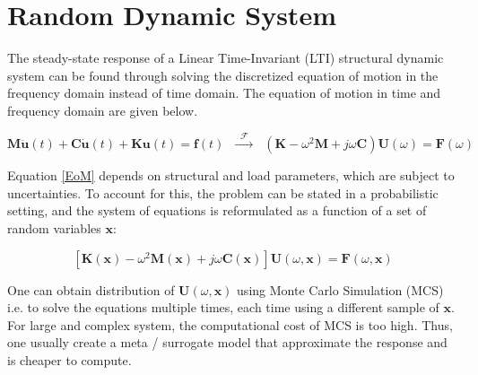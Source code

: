 \newpage
\section{Random Dynamic System}

The steady-state response of a Linear Time-Invariant (LTI) structural dynamic system can be found through solving the discretized equation of motion in the frequency domain instead of time domain.
The equation of motion in time and frequency domain are given below. 

\begin{equation}
    \mathbf{M}\ddot{\mathbf{u}}(t) +
    \mathbf{C}\dot{ \mathbf{u}}(t) +
    \mathbf{K}      \mathbf{u} (t)  =
    \mathbf{f}(t)
    \phantom{x}
    \xrightarrow{
        \phantom{x}
        \mathscr{F}
        \phantom{x}
    }
    \phantom{x}
    \left(
        \mathbf{K} - \omega^{2}\mathbf{M} +
        j\omega \mathbf{C}
    \right)
    \mathbf{U}(\omega) =
    \mathbf{F}(\omega)
\label{EoM}
\end{equation}

Equation \ref{EoM} depends on structural and load parameters, which are subject to uncertainties. 
To account for this, the problem can be stated in a probabilistic setting, and the system of equations is reformulated as a function of a set of random variables $\mathbf{x}$: 

\begin{equation}
    \left[
        \mathbf{K}(\mathbf{x}) - 
        \omega^{2}\mathbf{M}(\mathbf{x}) +
        j\omega \mathbf{C}(\mathbf{x})
    \right]
    \mathbf{U}(\omega,\mathbf{x}) =
    \mathbf{F}(\omega,\mathbf{x})
\label{Random EoM}
\end{equation}

One can obtain distribution of $\mathbf{U}(\omega,\mathbf{x})$ using Monte Carlo Simulation (MCS) i.e. to solve the equations multiple times, each time using a different sample of $\mathbf{x}$. 
For large and complex system, the computational cost of MCS is too high. 
Thus, one usually create a meta / surrogate model that approximate the response and is cheaper to compute. 


